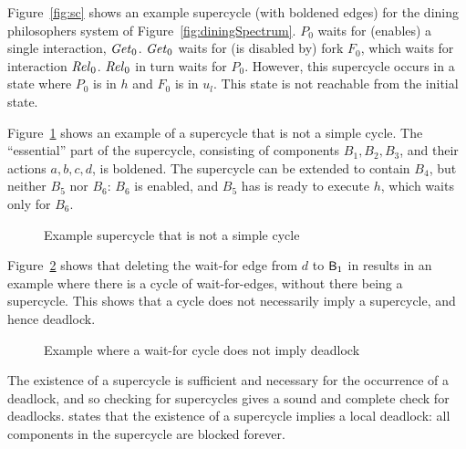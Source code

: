 \begin{figure*}[ht]
  \begin{center}
   \scalebox{0.4}{}
   \caption{Example supercycle for dining philosophers system of Figure~\ref{fig:diningSpectrum}.}
   \label{fig:sc}
  \end{center}
\end{figure*}


Figure~\ref{fig:sc} shows an example supercycle (with boldened edges) for the dining philosophers
system of Figure~\ref{fig:diningSpectrum}.
$P_0$ waits for (enables) a single interaction, $\mathit{Get}_0$. 
$\mathit{Get}_0$ waits for (is disabled by) fork $F_0$, which waits for interaction $\mathit{Rel}_0$.
$\mathit{Rel}_0$ in turn waits for $P_0$. However, this supercycle occurs in a state where $P_0$ is in $h$
and $F_0$ is in $u_l$. This state is not reachable from the initial state. 


Figure~\ref{fig:SCnotCycle} shows an example of a supercycle that is not a simple cycle. 
The ``essential'' part of the supercycle, consisting of components $B_1, B_2,B_3$, and their actions $a,b,c,d$, is boldened. 
The supercycle can be extended to contain $B_4$, but neither $B_5$ nor $B_6$: $B_6$ is enabled, and $B_5$ has is ready to execute $h$, which waits
only for $B_6$.
%
\begin{figure}[ht]
\begin{center}
\scalebox{0.6}{}
\caption{Example supercycle that is not a simple cycle}
\label{fig:SCnotCycle}
\end{center}
\end{figure}
%
Figure~\ref{fig:cycleOK} shows that deleting the wait-for edge from $d$ to $\mathsf{B}_1$ in  results in 
an example where there is
a cycle of wait-for-edges, without there being a supercycle. This shows
that a cycle does not necessarily imply a supercycle, and hence
deadlock. 
%
\begin{figure}[ht]
\begin{center}
\scalebox{0.6}{}
\caption{Example where a wait-for cycle does not imply deadlock}
\label{fig:cycleOK}
\end{center}
\end{figure}


The existence of a supercycle is sufficient and necessary for the occurrence of
a deadlock, and so checking for supercycles gives a sound and complete check for
deadlocks.  
%
 states that the
existence of a supercycle implies a local deadlock: all components in
the supercycle are blocked forever.

